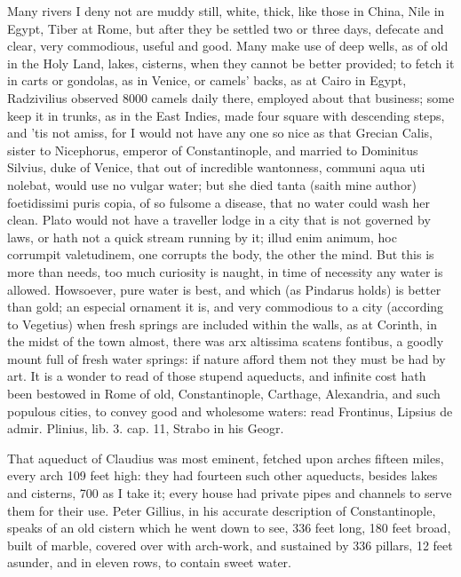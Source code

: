 {Many rivers I deny not are muddy still, white, thick, like those in
China, Nile in Egypt, Tiber at Rome, but after they be settled two or
three days, defecate and clear, very commodious, useful and good. Many
make use of deep wells, as of old in the Holy Land, lakes, cisterns,
when they cannot be better provided; to fetch it in carts or gondolas,
as in Venice, or camels' backs, as at Cairo in Egypt, Radzivilius
observed 8000 camels daily there, employed about that business; some
keep it in trunks, as in the East Indies, made four square with
descending steps, and 'tis not amiss, for I would not have any one so
nice as that Grecian Calis, sister to Nicephorus, emperor of
Constantinople, and married to Dominitus Silvius, duke of Venice,
that out of incredible wantonness, communi aqua uti nolebat, would use
no vulgar water; but she died tanta (saith mine author) foetidissimi
puris copia, of so fulsome a disease, that no water could wash her
clean. Plato would not have a traveller lodge in a city that is
not governed by laws, or hath not a quick stream running by it; illud
enim animum, hoc corrumpit valetudinem, one corrupts the body, the
other the mind. But this is more than needs, too much curiosity is
naught, in time of necessity any water is allowed. Howsoever, pure
water is best, and which (as Pindarus holds) is better than gold; an
especial ornament it is, and very commodious to a city (according to
Vegetius) when fresh springs are included within the walls, as at
Corinth, in the midst of the town almost, there was arx altissima
scatens fontibus, a goodly mount full of fresh water springs: if nature
afford them not they must be had by art. It is a wonder to read of
those stupend aqueducts, and infinite cost hath been bestowed in
Rome of old, Constantinople, Carthage, Alexandria, and such populous
cities, to convey good and wholesome waters: read Frontinus,
Lipsius de admir. Plinius, lib. 3. cap. 11, Strabo in his Geogr.

That aqueduct of Claudius was most eminent, fetched upon arches fifteen
miles, every arch 109 feet high: they had fourteen such other
aqueducts, besides lakes and cisterns, 700 as I take it; every
house had private pipes and channels to serve them for their use. Peter
Gillius, in his accurate description of Constantinople, speaks of an
old cistern which he went down to see, 336 feet long, 180 feet broad,
built of marble, covered over with arch-work, and sustained by 336
pillars, 12 feet asunder, and in eleven rows, to contain sweet water.

}
